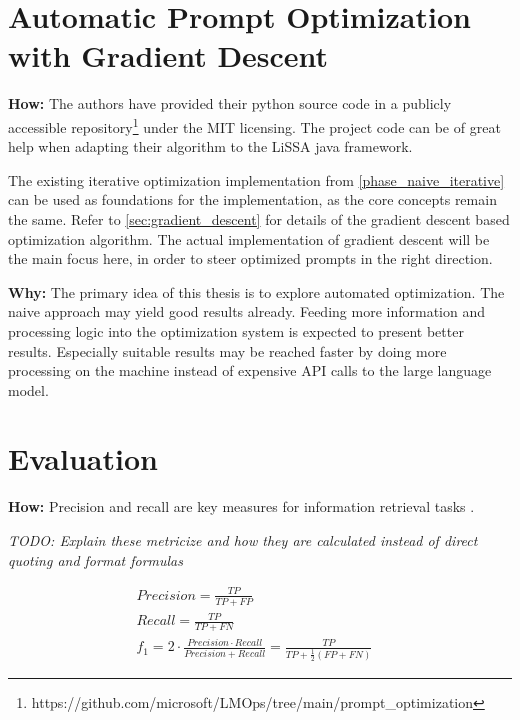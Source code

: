 \section{Automatic Prompt Optimization with Gradient Descent}
\label{approach:sec:gradient_descent}
\textbf{How:} The authors have provided their python source code in a publicly accessible repository\footnote{https://github.com/microsoft/LMOps/tree/main/prompt\_optimization} under the MIT licensing. The project code can be of great help when adapting their algorithm to the LiSSA java framework.

The existing iterative optimization implementation from \ref{phase_naive_iterative} can be used as foundations for the implementation, as the core concepts remain the same. Refer to \ref{sec:gradient_descent} for details of the gradient descent based optimization algorithm. The actual implementation of gradient descent will be the main focus here, in order to steer optimized prompts in the right direction.


\textbf{Why:} The primary idea of this thesis is to explore automated optimization. The naive approach may yield good results already. Feeding more information and processing logic into the optimization system is expected to present better results. Especially suitable results may be reached faster by doing more processing on the machine instead of expensive API calls to the large language model.


\section{Evaluation}
\label{approach:sec:evaluation}
\textbf{How:} Precision and recall are key measures for information retrieval tasks \cite{hayes2006AdvancingCandidate}. 

\textit{TODO: Explain these metricize and how they are calculated instead of direct quoting and format formulas} 

\begin{align*} 
    Precision = \frac{TP}{TP + FP} &\\
    Recall = \frac{TP}{TP + FN} &\\
    f_1 = 2 \cdot \frac{Precision \cdot Recall}{Precision + Recall} = \frac{TP}{TP + \frac{1}{2}(FP + FN)} &
\end{align*}




